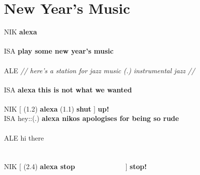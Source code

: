 \section{New Year's Music}\label{app:fragments-home nye-music}
\begin{inlinefrag}
    \begin{transcript}
        \by NIK {\textbf{alexa}} \\
         \\
        \by ISA {\textbf{play some new year’s music}} \\
         \\
        \by ALE {\textit{// here’s a station for jazz music (.) instrumental jazz //}} \\
         \\
        \by ISA {\textbf{alexa this is not what we wanted}} \\
        \by     {[ ((laughs))~~~~~~~~~~~~~]} \\
        \by NIK {[ (1.2) \textbf{alexa} (1.1) \textbf{shut} ] \textbf{up!}} \\
        \by ISA {hey::\intUp (.) \textbf{alexa nikos apologises for being so rude}} \\
         \\
        \by ALE {hi there} \\
         \\
         \\
        \by NIK {[ (2.4) \textbf{alexa stop} ~~~~~~~~~~~~~~] \textbf{stop!}} \\
    \end{transcript}
\end{inlinefrag}


